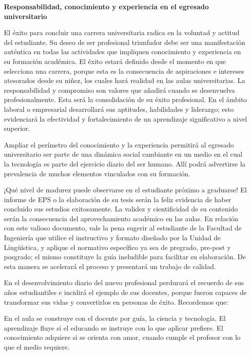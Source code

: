 \documentclass[12pt,spanish,Letterpaper,openany]{book}
\begin{document}
\begin {center}

\textbf{Responsabilidad, conocimiento y experiencia en el egresado universitario}

\end {center}

El éxito para concluir una carrera universitaria radica en la voluntad y actitud del estudiante. Su deseo de ser profesional triunfador debe ser una manifestación auténtica en todas las actividades que impliquen conocimiento y experiencia en su formación académica. El éxito estará definido desde el momento en que selecciona una carrera, porque esta es la consecuencia de aspiraciones e intereses atesorados desde su niñez, los cuales hará realidad en las aulas universitarias. La responsabilidad y compromiso son valores que añadirá cuando se desenvuelva profesionalmente. Esta será la consolidación de su éxito profesional. En el ámbito laboral o empresarial desarrollará sus aptitudes, habilidades y liderazgo; esto evidenciará la efectividad y fortalecimiento de un aprendizaje significativo a nivel superior.

Ampliar el perímetro del conocimiento y la experiencia permitirá al egresado universitario ser parte de una dinámica social cambiante en un medio en el cual la tecnología es parte del ejercicio diario del ser humano. Allí podrá advertirse la prevalencia de muchos elementos vinculados con su formación.

¡Qué nivel de madurez puede observarse en el estudiante próximo a graduarse! El informe de EPS o la elaboración de su tesis serán la feliz evidencia de haber concluido sus estudios exitosamente. La validez y cientificidad de su contenido serán la consecuencia del aprovechamiento académico en las aulas. En relación con este valioso documento, vale la pena sugerir al estudiante de la Facultad de Ingeniería que utilice el instructivo y formato diseñado por la Unidad de Lingüística, y aplique el normativo específico ya sea de pregrado, pre-post y posgrado; el mismo constituye la guía ineludible para facilitar su elaboración. De esta manera se acelerará el proceso y presentará un trabajo de calidad.

En el desenvolvimiento diario del nuevo profesional perdurará el recuerdo de sus años estudiantiles e incidirá el ejemplo de sus docentes, porque fueron capaces de transformar sus vidas y convertirlos en personas de éxito. Recordemos que:

\begin{center}
En el aula se construye con el docente por guía, la ciencia y tecnología. El aprendizaje fluye si el educando se instruye con lo que aplicar prefiere.
El conocimiento adquiere si se orienta con amor, cuando cumple el profesor con lo que el medio requiere.


\end{center}
\end{document}
